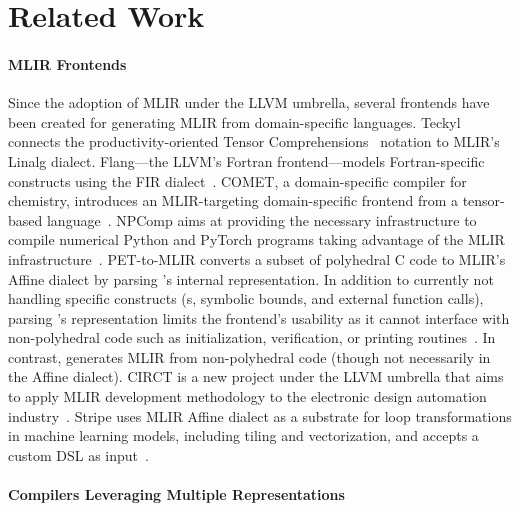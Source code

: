 \section{Related Work}




\paragraph{MLIR Frontends}

Since the adoption of MLIR under the LLVM umbrella, several frontends have been created for generating MLIR from domain-specific languages. Teckyl~\cite{teckyl} connects the productivity-oriented Tensor Comprehensions~\cite{tc} notation to MLIR's Linalg dialect. Flang---the LLVM's Fortran frontend---models Fortran-specific constructs using the FIR dialect~\cite{flang}. COMET, a domain-specific compiler for chemistry, introduces an MLIR-targeting domain-specific frontend from a tensor-based language~\cite{comet}. NPComp aims at providing the necessary infrastructure to compile numerical Python and PyTorch programs taking advantage of the MLIR infrastructure~\cite{npcomp}. PET-to-MLIR converts a subset of polyhedral C code to MLIR's Affine dialect by parsing 's internal representation. In addition to currently not handling specific constructs (s, symbolic bounds, and external function calls), parsing 's representation limits the frontend's usability as it cannot interface with non-polyhedral code such as initialization, verification, or printing routines~\cite{komisarczyk2020pet}. In contrast, \tool generates MLIR from non-polyhedral code (though not necessarily in the Affine dialect). CIRCT is a new project under the LLVM umbrella that aims to apply MLIR development methodology to the electronic design automation industry~\cite{circt}. Stripe uses MLIR Affine dialect as a substrate for loop transformations in machine learning models, including tiling and vectorization, and accepts a custom DSL as input~\cite{stripe}.

\paragraph{Compilers Leveraging Multiple Representations}

